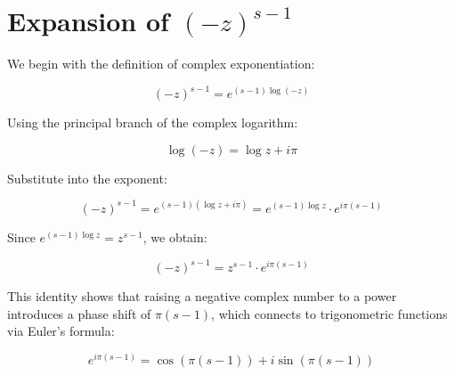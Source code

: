 \documentclass{article}
\begin{document}
\section*{Expansion of \((-z)^{s-1}\)}

We begin with the definition of complex exponentiation:

\[
(-z)^{s-1} = e^{(s-1) \log(-z)}
\]

Using the principal branch of the complex logarithm:

\[
\log(-z) = \log z + i\pi
\]

Substitute into the exponent:

\[
(-z)^{s-1} = e^{(s-1)(\log z + i\pi)} = e^{(s-1)\log z} \cdot e^{i\pi(s-1)}
\]

Since \( e^{(s-1)\log z} = z^{s-1} \), we obtain:

\[
(-z)^{s-1} = z^{s-1} \cdot e^{i\pi(s-1)}
\]

This identity shows that raising a negative complex number to a power introduces a phase shift of \( \pi(s-1) \), which connects to trigonometric functions via Euler's formula:

\[
e^{i\pi(s-1)} = \cos(\pi(s-1)) + i \sin(\pi(s-1))
\]
\end{document}
